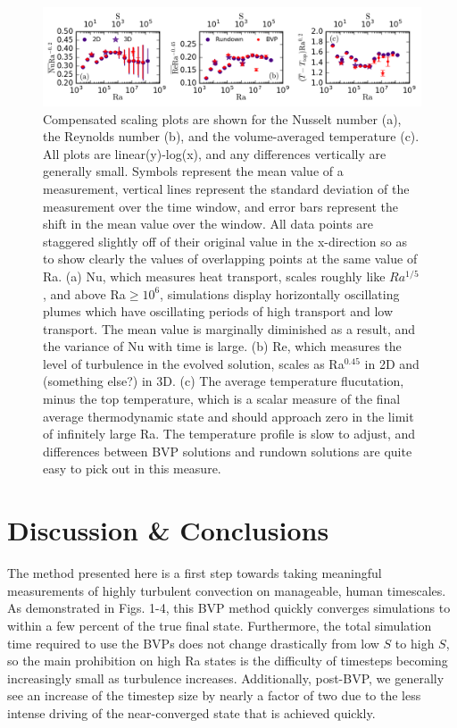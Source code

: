 \documentclass[aps, pre, onecolumn, nofootinbib, notitlepage, groupedaddress, amsfonts, amssymb, amsmath, longbibliography]{revtex4-1}
\begin{document}
\begin{figure}[t]
\includegraphics[width=\textwidth]{./figs/parameter_space_comparison.png}
\caption{Compensated scaling plots are shown for the Nusselt number (a), the
Reynolds number (b), and the volume-averaged temperature (c).  All plots are linear(y)-log(x),
and any differences vertically are generally small.  Symbols represent the mean value of
a measurement, vertical lines represent the standard deviation of the measurement over the
time window, and error bars represent the shift in the mean value over the window.
All data points are staggered slightly off of their original value in the x-direction
so as to show clearly the values of overlapping points at the same value of Ra. 
(a) Nu, which measures heat transport, scales roughly like $Ra^{1/5}$, and above Ra$\geq 10^6$,
simulations display horizontally oscillating plumes which have oscillating periods of high transport
and low transport.  The mean value is marginally diminished as a result, and the variance of Nu with time
is large. (b) Re, which measures the level of turbulence in the evolved solution, scales as
Ra$^{0.45}$ in 2D and (something else?) in 3D. (c) The average temperature flucutation, minus the top
temperature, which is a scalar measure of the final average thermodynamic state and should approach zero
in the limit of infinitely large Ra.
The temperature profile is slow to adjust, and differences between
BVP solutions and rundown solutions are quite easy to pick out in this measure.
\label{fig:parameter_space_comparison} }
\end{figure}


\section{Discussion \& Conclusions}
\label{sec:results}
The method presented here is a first step towards taking meaningful measurements
of highly turbulent convection on manageable, human timescales.  As demonstrated in Figs.
1-4, this BVP method quickly converges simulations to within a few percent of the true final
state. Furthermore, the total simulation time required to use the BVPs does not change drastically from
low $S$ to high $S$, so the main prohibition on high Ra states is the difficulty of timesteps becoming
increasingly small as turbulence increases.  Additionally, post-BVP, we generally see an increase of the
timestep size by nearly a factor of two due to the less intense driving of the near-converged state that
is achieved quickly.
\end{document}
